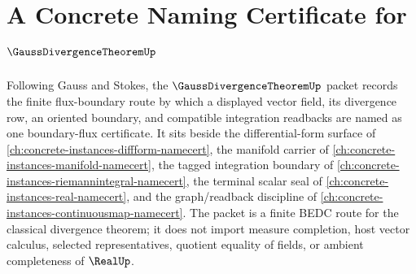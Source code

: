 \chapter{A Concrete Naming Certificate for $\GaussDivergenceTheoremUp$}
\label{ch:concrete-instances-gauss-divergence-theorem-namecert}

Following Gauss and Stokes, the $\GaussDivergenceTheoremUp$ packet records the finite flux-boundary route by which a displayed vector field, its divergence row, an oriented boundary, and compatible integration readbacks are named as one boundary-flux certificate. It sits beside the differential-form surface of \autoref{ch:concrete-instances-diffform-namecert}, the manifold carrier of \autoref{ch:concrete-instances-manifold-namecert}, the tagged integration boundary of \autoref{ch:concrete-instances-riemannintegral-namecert}, the terminal scalar seal of \autoref{ch:concrete-instances-real-namecert}, and the graph/readback discipline of \autoref{ch:concrete-instances-continuousmap-namecert}. The packet is a finite BEDC route for the classical divergence theorem; it does not import measure completion, host vector calculus, selected representatives, quotient equality of fields, or ambient completeness of $\RealUp$.

